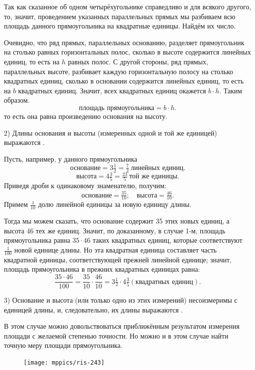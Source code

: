 \documentclass[twoside]{book}
\begin{document}
Так как сказанное об одном четырёхугольнике справедливо и для всякого другого, то, значит, проведением указанных параллельных прямых мы разбиваем всю площадь данного прямоугольника на квадратные единицы.
Найдём их число.

Очевидно, что ряд прямых, параллельных основанию, разделяет прямоугольник на столько равных горизонтальных полос, сколько в высоте содержится линейных единиц, то есть на $h$ равных полос.
С другой стороны, ряд прямых, параллельных высоте, разбивает каждую горизонтальную полосу на столько квадратных единиц, сколько в основании содержится линейных единиц, то есть на $b$ квадратных единиц.
Значит, всех квадратных единиц окажется $b\cdot h$.
Таким образом.
\[\text{площадь прямоугольника} = b\cdot h.\]
то есть она равна произведению основания на высоту.

2) Длины основания и высоты (измеренных одной и той же единицей) выражаются .

Пусть, например, у данного прямоугольника
\[\text{основание} = 3\tfrac12=\tfrac72~\text{линейных единиц.}\]
\[\text{высота} = 4\tfrac35 = \tfrac{23}5~\text{той же единицы.}\]
Приведя дроби к одинаковому знаменателю, получим:
\[\text{основание} = \tfrac{35}{10};
\quad
\text{высота} = \tfrac{46}{10}.
\]
Примем $\tfrac1{10}$ долю линейной единицы за новую единицу длины.

Тогда мы можем сказать, что основание содержит 35 этих новых единиц, а высота 46 тех же единиц.
Значит, по доказанному, в случае 1-м, площадь прямоугольника равна $35 \cdot 46$ таких квадратных единиц, которые соответствуют $\tfrac1{100}$ новой единице длины.
Но эта квадратная единица составляет часть квадратной единицы, соответствующей прежней линейной единице;
значит, площадь прямоугольника в прежних квадратных единицах равна:
\[\frac{35\cdot 46}{100}=\frac{35}{10}\cdot\frac{46}{10}=3\tfrac12\cdot4\tfrac35(\text{квадратных единиц}).\]

3) Основание и высота (или только одно из этих измерений) несоизмеримы с единицей длины, и, следовательно, их длины выражаются .

В этом случае можно довольствоваться приближённым результатом измерения площади с желаемой степенью точности.
Но можно и в этом случае найти точную меру площади прямоугольника.

\begin{figure}
\centering
\texttt{[image: mppics/ris-243]}
\caption{}\label{1938/ris-243}
\end{figure}
\end{document}
